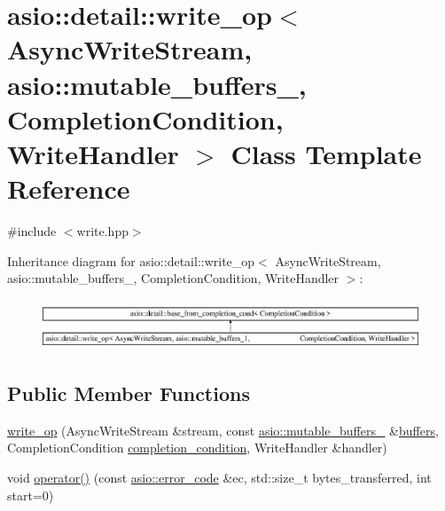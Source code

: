 \hypertarget{classasio_1_1detail_1_1write__op_3_01_async_write_stream_00_01asio_1_1mutable__buffers__1_00_01_203e79af9e8ed472722d2a863f7168cc}{}\section{asio\+:\+:detail\+:\+:write\+\_\+op$<$ Async\+Write\+Stream, asio\+:\+:mutable\+\_\+buffers\+\_, Completion\+Condition, Write\+Handler $>$ Class Template Reference}
\label{classasio_1_1detail_1_1write__op_3_01_async_write_stream_00_01asio_1_1mutable__buffers__1_00_01_203e79af9e8ed472722d2a863f7168cc}


{\ttfamily \#include $<$write.\+hpp$>$}

Inheritance diagram for asio\+:\+:detail\+:\+:write\+\_\+op$<$ Async\+Write\+Stream, asio\+:\+:mutable\+\_\+buffers\+\_, Completion\+Condition, Write\+Handler $>$\+:\begin{figure}[H]
\begin{center}
\leavevmode
\includegraphics[height=1.513514cm]{classasio_1_1detail_1_1write__op_3_01_async_write_stream_00_01asio_1_1mutable__buffers__1_00_01_203e79af9e8ed472722d2a863f7168cc}
\end{center}
\end{figure}
\subsection*{Public Member Functions}
\begin{DoxyCompactItemize}
\item 
\hyperlink{classasio_1_1detail_1_1write__op_3_01_async_write_stream_00_01asio_1_1mutable__buffers__1_00_01_203e79af9e8ed472722d2a863f7168cc_ab978d16ce91bafdd7b8940a35f8f3392}{write\+\_\+op} (Async\+Write\+Stream \&stream, const \hyperlink{classasio_1_1mutable__buffers__1}{asio\+::mutable\+\_\+buffers\+\_} \&\hyperlink{group__async__read_ga54dede45c3175148a77fe6635222c47d}{buffers}, Completion\+Condition \hyperlink{group__async__read_gae2e215d5013596cc2b385bb6c13fa518}{completion\+\_\+condition}, Write\+Handler \&handler)
\item 
void \hyperlink{classasio_1_1detail_1_1write__op_3_01_async_write_stream_00_01asio_1_1mutable__buffers__1_00_01_203e79af9e8ed472722d2a863f7168cc_a5fab8154123ff86d75d809de044c2a35}{operator()} (const \hyperlink{classasio_1_1error__code}{asio\+::error\+\_\+code} \&ec, std\+::size\+\_\+t bytes\+\_\+transferred, int start=0)
\end{DoxyCompactItemize}

